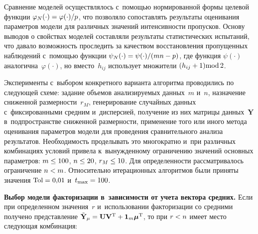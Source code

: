 \begin{multicols}{2}
{}
     
     Сравнение моделей осуществлялось с~помощью нормированной формы 
целевой функции $\varphi_N(\cdot) \hm=\varphi(\cdot)/p$, что позволяло 
сопоставлять результаты оценивания параметров модели для различных 
значений интенсивности пропусков. Основу выводов о свойствах моделей 
составляли результаты статистических испытаний, что давало возможность 
проследить за качеством восстановления пропущенных наблюдений 
с~помощью функции $\psi_N(\cdot)\hm= \psi(\cdot)/(mn\hm-p)$, где функция 
$\psi(\cdot)$ аналогична~$\varphi(\cdot)$, но вместо~$h_{ij}$ использует 
множители $(h_{ij}\hm+1) \mathrm{mod}\,2$.
     
     Эксперименты с~выбором конкретного варианта алгоритма проводились 
по следующей схеме: задание объемов анализируемых данных~$m$ и~$n$, 
назначение сниженной размерности~$r_M$, генерирование случайных данных с~фиксированными средним и~дисперсией, получение из них матрицы 
данных~$\mathbf{Y}$ в~подпространстве сниженной размерности, применение того или 
иного метода оценивания параметров модели для проведения сравнительного 
анализа результатов. Необходимость проделывать это многократно и~при 
различных комбинациях условий привела к~вынужденному ограничению 
значений основных параметров: $m\hm\leq 100$, $n\hm\leq 20$, $r_M\hm\leq 
10$. Для определенности рассматривалось ограничение $n\hm<m$. 
Относительно итерационных алгоритмов были приняты значения $\mathrm{Tol}\hm= 
0{,}01$ и~$t_{\max}\hm=100$. 
     
     \textbf{Выбор модели факторизации в~зависимости от учета вектора 
средних.} Если при определенном значения~$r$ и~использовании факторизации 
со средними получено представление $\tilde{\mathbf{Y}}_\mu\hm= 
\mathbf{U}\mathbf{V}^{\mathrm{T}}\hm+\mathbf{1}_m \bm{\mu}^{\mathrm{T}}$, то при $r\hm< n$ 
имеет место следующая комбинация:


\end{multicols}
